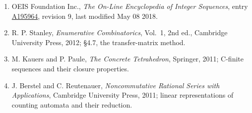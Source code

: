 \documentclass[11pt]{article}
\theoremstyle{definition}
\begin{document}
\begin{enumerate}

\item OEIS Foundation Inc., \emph{The On-Line Encyclopedia of Integer Sequences}, entry \href{https://oeis.org/A195964}{A195964}, revision 9, last modified May 08 2018.

\item R. P. Stanley, \emph{Enumerative Combinatorics}, Vol.~1, 2nd ed., Cambridge University Press, 2012; \S4.7, the transfer-matrix method.

\item M. Kauers and P. Paule, \emph{The Concrete Tetrahedron}, Springer, 2011; C-finite sequences and their closure properties.

\item J. Berstel and C. Reutenauer, \emph{Noncommutative Rational Series with Applications}, Cambridge University Press, 2011; linear representations of counting automata and their reduction.

\end{enumerate}
\end{document}
